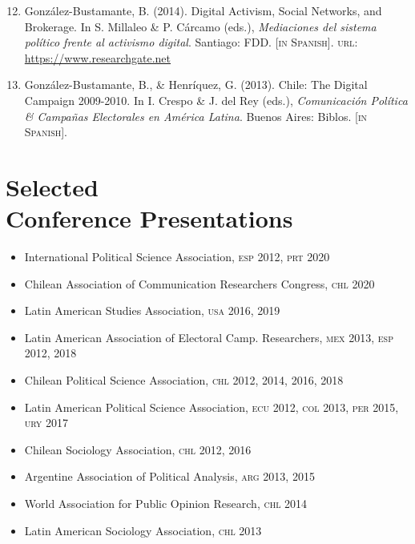 \documentclass[letterpaper,margin]{res}
\newenvironment{benumerate}[1]{
    \let\oldItem\item
    \def\item{\addtocounter{enumi}{-2}\oldItem}
    \begin{enumerate}
    \setcounter{enumi}{#1}
    \addtocounter{enumi}{1}
}{
    \end{enumerate}
}
\begin{document}
\begin{resume}
\begin{benumerate}{11}
\item{\small Gonz\'alez-Bustamante, B. (2014). Digital Activism, Social Networks, and Brokerage. In S. Millaleo \& P. C\'arcamo (eds.), {\itshape Mediaciones del sistema pol\'itico frente al activismo digital}. Santiago: FDD. {\footnotesize \scshape [in Spanish]}. {\scshape url}: \href{https://www.researchgate.net/publication/321992867_Activismo_digital_redes_sociales_e_intermediacion}{https://www.researchgate.net}}\vspace{1mm}


\item{\small Gonz\'alez-Bustamante, B., \& Henr\'iquez, G. (2013). Chile: The Digital Campaign 2009-2010. In I. Crespo \& J. del Rey (eds.), {\itshape Comunicaci\'on Pol\'itica \& Campa\~nas Electorales en Am\'erica Latina}. Buenos Aires: Biblos. {\footnotesize \scshape [in Spanish].}}
\end{benumerate}


\section{\footnotesize Selected \\ Conference Presentations}

\begin{itemize}
\item{\small International Political Science Association, {\scshape esp} 2012, {\scshape prt} 2020}
\item{\small Chilean Association of Communication Researchers Congress, {\scshape chl} 2020}
\item{\small Latin American Studies Association, {\scshape usa} 2016, 2019}
\item{\small Latin American Association of Electoral Camp. Researchers, {\scshape mex} 2013, {\scshape esp} 2012, 2018}
\item{\small Chilean Political Science Association, {\scshape chl} 2012, 2014, 2016, 2018}
\item{\small Latin American Political Science Association, {\scshape ecu} 2012, {\scshape col} 2013, {\scshape per} 2015, {\scshape ury} 2017}
\item{\small Chilean Sociology Association, {\scshape chl} 2012, 2016}
\item{\small Argentine Association of Political Analysis, {\scshape arg} 2013, 2015}
\item{\small World Association for Public Opinion Research, {\scshape chl} 2014}
\item{\small Latin American Sociology Association, {\scshape chl} 2013}
\end{itemize}


\end{resume}
\end{document}
